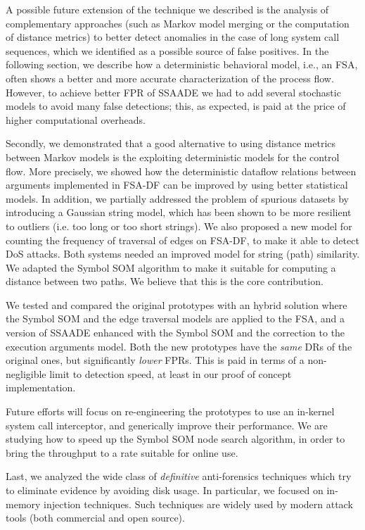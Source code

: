 A possible future extension of the technique we described is the analysis of complementary approaches (such as Markov model merging or the computation of distance metrics) to better detect anomalies in the case of long system call sequences, which we identified as a possible source of false positives. In the following section, we describe how a deterministic behavioral model, i.e., an \ac{FSA}, often shows a better and more accurate characterization of the process flow. However, to achieve better \ac{FPR} of \ac{SSAADE} we had to add several stochastic models to avoid many false detections; this, as expected, is paid at the price of higher computational overheads.

Secondly, we demonstrated that a good alternative to using distance metrics between Markov models is the exploiting deterministic models for the control flow. More precisely, we showed how the deterministic dataflow relations between arguments implemented in FSA-DF can be improved by using better statistical models. In addition, we partially addressed the problem of spurious datasets by introducing a Gaussian string model, which has been shown to be more resilient to outliers (i.e. too long or too short strings). We also proposed a new model for counting the frequency of traversal of edges on FSA-DF, to make it able to detect \ac{DoS} attacks. Both systems needed an improved model for string (path) similarity. We adapted the Symbol \ac{SOM} algorithm to make it suitable for computing a distance between two paths. We believe that this is the core contribution. 

We tested and compared the original prototypes with an hybrid solution where the Symbol \ac{SOM} and the edge traversal models are applied to the \ac{FSA}, and a version of \ac{SSAADE} enhanced with the Symbol SOM and the correction to the execution arguments model. Both the new prototypes have the \emph{same} \acp{DR} of the original ones, but significantly \emph{lower} \acp{FPR}. This is paid in terms of a non-negligible limit to detection speed, at least in our proof of concept implementation.

Future efforts will focus on re-engineering the prototypes to use an in-kernel system call interceptor, and generically improve their performance. We are studying how to speed up the Symbol \ac{SOM} node search algorithm, in order to bring the throughput to a rate suitable for online use.

Last, we analyzed the wide class of \emph{definitive} anti-forensics techniques which try to eliminate evidence by avoiding disk usage. In particular, we focused on in-memory injection techniques. Such techniques are widely used by modern attack tools (both commercial and open source). 

